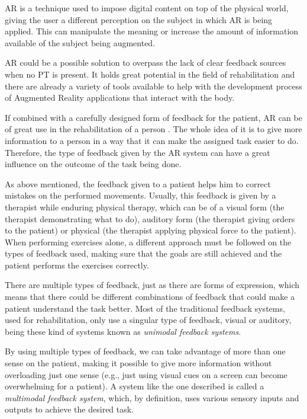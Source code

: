 \ac{AR} is a technique used to impose digital content on top of the physical world,
giving the user a different perception on the subject in which \ac{AR} is being
applied. This can manipulate the meaning or increase the amount of information available
of the subject being augmented.

\ac{AR} could be a possible solution to overpass the lack of clear feedback sources when no \ac{PT} is present.
It holds great potential in the field of rehabilitation %
and there are already a variety of tools available to help with the development process of Augmented
Reality applications that interact with the body\cite{Gama2012a}.

If combined with a carefully designed form of feedback for the patient,
\ac{AR} can be of great use in the rehabilitation of a person \cite{Sigrist2013}. The whole 
idea of it is to give more information to a person in a way that it can make 
the assigned task easier to do.
Therefore, the type of feedback given by the \ac{AR} system can have a great influence 
on the outcome of the task being done.\cite{Causo2011}

As above mentioned, the feedback given to a patient helps him to correct mistakes on the performed movements.
Usually, this feedback is given by a therapist while enduring physical therapy, which can be of a visual form (the therapist demonstrating what to do), auditory form (the therapist giving orders to the patient) or physical (the therapist applying physical force to the patient). 
When performing exercises alone, a different approach must be followed on the types of feedback used, making sure that the goals 
are still achieved and the patient performs the exercises correctly.

There are multiple types of feedback, just as there are forms of expression, which means that 
there could be different combinations of feedback that could make a patient understand the task better.
Most of the traditional feedback systems, used for rehabilitation, only use a singular type of feedback,
visual or auditory\cite{Design2005}, being these kind of systems known as \emph{unimodal feedback systems}.

By using multiple types of feedback, we can take advantage of more than one sense on the patient, 
making it possible to give more information without overloading just one sense (e.g., just using visual
cues on a screen can become overwhelming for a patient). A system like the one described is called a 
\emph{multimodal feedback system}, which, by definition, uses various sensory inputs and outputs to achieve the desired task.



